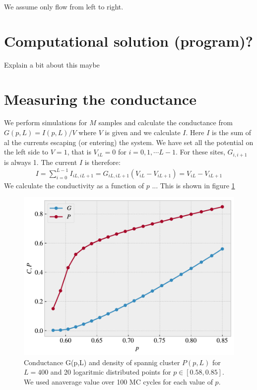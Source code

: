 \documentclass[reprint, amsmath, amssymb, aps]{revtex4-2}
\begin{document}
We assume only flow from left to right.

\section{Computational solution (program)?}
Explain a bit about this maybe


\section{Measuring the conductance}
We perform simulations for $M$ samples and calculate the conductance from $G(p,L) = I(p,L)/V$ where $V$ is given and we calculate $I$. Here $I$ is the sum of al the currents escaping (or entering) the system. We have set all the potential on the left side to $V = 1$, that is $V_{iL} = 0$ for $i = 0,1, \cdots L-1$. For these sites, $G_{i,i+1}$ is always 1. The current $I$ is therefore:
\begin{align*}
  I = \sum\limits_{i=0}^{L-1}I_{iL,iL+1} = G_{iL,iL+1}(V_{iL}-V_{iL+1}) = V_{iL} - V_{iL+1}
\end{align*}
We calculate the conductivity as a function of $p$ ... This is shown in figure \ref{fig:GP(p)}

\begin{figure}[H]
  \includegraphics[width=\linewidth]{figures/GP(p).pdf}
  \caption{Conductance G(p,L) and density of spannig cluster $P(p,L)$ for $L = 400$ and 20 logaritmic distributed points for $p \in [0.58, 0.85]$. We used anaverage value over 100 MC cycles for each value of $p$.}
  \label{fig:GP(p)}
\end{figure}
\end{document}
